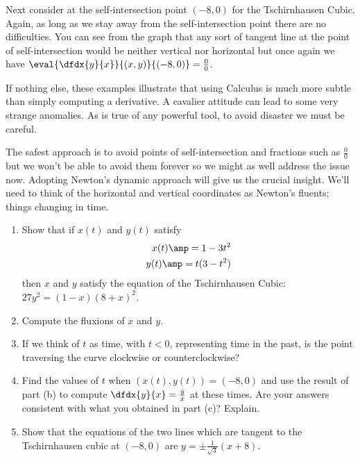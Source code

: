 Next consider at the self-intersection point $(-8,0)$ for the
Tschirnhausen Cubic. Again, as long as we stay away from the
self-intersection point there are no difficulties. You can see from
the graph that any sort of tangent line at the point of
self-intersection would be neither vertical nor horizontal but once
again we have $\eval{\dfdx{y}{x}}{(x,y)}{(-8,0)}=\frac{0}{0}$.

If nothing else, these examples illustrate that using Calculus is much
more subtle than simply computing a derivative. A cavalier attitude
can lead to some very strange anomalies.  As is true of any powerful
tool, to avoid disaster we must be careful.

The safest approach is to avoid points of self-intersection and
fractions such as $\frac00$ but we won't be able to avoid them forever
so we might as well address the issue now.  Adopting Newton's dynamic
approach will give us the crucial insight. We'll need to
think of the horizontal and vertical coordinates as Newton's
fluents; things changing in time.


  \begin{embeddedproblem-enumerate}
    \label{problem:TschirnhausenCubic}
    \begin{enumerate}[label={\bf{}(\alph*)}]
    \item Show that if $x(t)$ and $y(t)$ satisfy
      \begin{align*}
        x(t)\amp=1-3t^2\\
        y(t)\amp=t(3-t^2)
      \end{align*}
      then $x$ and $y$ satisfy the equation of the Tschirnhausen
      Cubic: $27{y}^{2}=\left(1-x\right){\left(8+x\right)}^{2}$.
    \item Compute the fluxions of $x$ and $y$.
      \item If we think of $t$ as time, with $t\lt 0$, representing
        time in the past, is the point traversing the curve clockwise
        or counterclockwise?
        \\
      \item Find the values of $t$ when $(x(t), y(t)) = (-8,0)$ and
        use the result of part (b) to compute
        $\dfdx{y}{x} =\frac{\dot{y}}{\dot{x}}$ at these times.
        Are
        your answers consistent with what you obtained in part (c)?
        Explain.
      \item Show that the equations of the two lines which are tangent
        to the Tschirnhausen cubic at $(-8, 0)$ are
        $
        y=\pm\frac{1}{\sqrt{3}}(x+8).
        $
    \end{enumerate}
  \end{embeddedproblem-enumerate}


